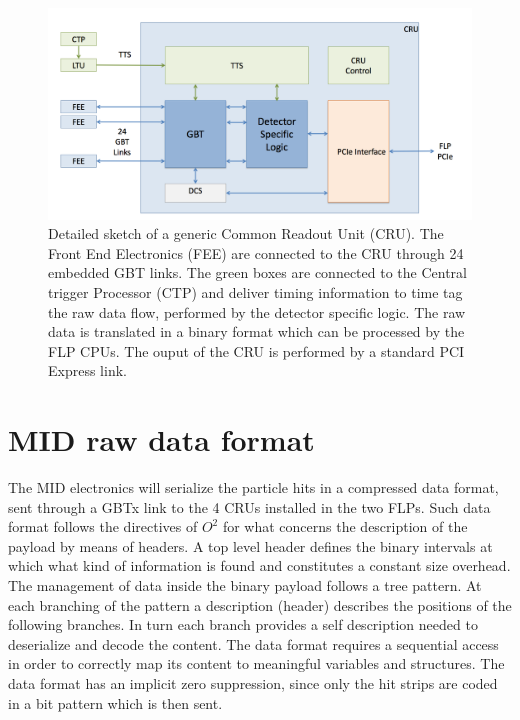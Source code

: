 \begin{figure}[!ht]
\begin{center}
\includegraphics[width=0.9\linewidth]{Chapters/O2/Figs/CRU.pdf}
\caption{Detailed sketch of a generic Common Readout Unit (CRU). The Front End Electronics (FEE) are connected to the CRU through 24 embedded GBT links. The green boxes are connected to the Central trigger Processor (CTP) and deliver timing information to time tag the raw data flow, performed by the detector specific logic. The raw data is translated in a binary format which can be processed by the FLP CPUs. The ouput of the CRU is performed by a standard PCI Express link.}
\label{fig:O2_TF}
\end{center}
\end{figure}

\section{MID raw data format}
The MID electronics will serialize the particle hits in a compressed data format, sent through a GBTx link to the 4 CRUs installed in the two FLPs.
Such data format follows the directives of $O^2$ for what concerns the description of the payload by means of headers.
A top level header defines the binary intervals at which what kind of information is found and constitutes a constant size overhead.
The management of data inside the binary payload follows a tree pattern.
At each branching of the pattern a description (header) describes the positions of the following branches.
In turn each branch provides a self description needed to deserialize and decode the content.
The data format requires a sequential access in order to correctly map its content to meaningful variables and structures.
The data format has an implicit zero suppression, since only the hit strips are coded in a bit pattern which is then sent.

